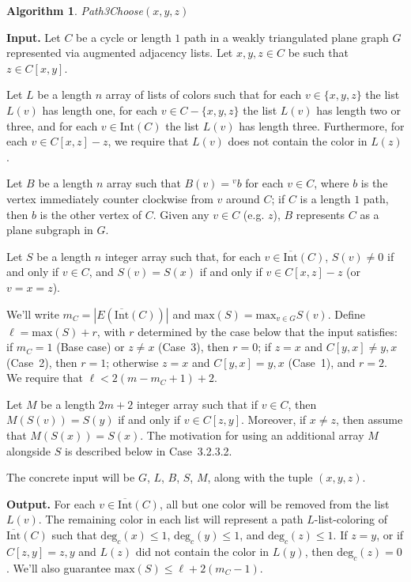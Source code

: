 \documentclass[12pt,letterpaper]{article}
\newcommand{\adj}[2]{{}^{#1}{#2}}
\newcommand{\graphinto}{\text{Int}}
\newcommand{\graphintc}{\overline{\text{Int}}}
\theoremstyle{plain}
\theoremstyle{definition}
\theoremstyle{break}
\newtheorem{algorithm}[lemma]{Algorithm}     %
\begin{document}
\begin{algorithm}\label{A:hartman_impl} \emph{Path3Choose}$(x,y,z)$

\textbf{Input.} Let $C$ be a cycle or length $1$ path in a
weakly triangulated plane graph $G$ represented via augmented
adjacency lists.
Let $x,y,z\in C$ be such that $z\in C[x,y]$.

Let $L$ be a length $n$ array of lists of colors
such that for each $v\in\{x,y,z\}$ the list $L(v)$ has length one,
for each $v\in C-\{x,y,z\}$ the list $L(v)$ has length two
or three, and for each $v\in \graphinto(C)$ the list
$L(v)$ has length three. Furthermore, for each $v\in C[x,z] - z$, we require
that $L(v)$ does not contain the color in $L(z)$.

Let $B$ be a length $n$ array such that $B(v)=\adj{v}{b}$ for each $v\in C$, where
$b$ is the vertex immediately counter clockwise
from $v$ around $C$; if $C$ is a length $1$ path, then $b$
is the other vertex of $C$. Given any $v\in C$ (e.g. $z$),
$B$ represents $C$ as a plane subgraph in $G$.

Let $S$ be a length $n$ integer array such
that, for each $v\in\graphintc(C)$, $S(v)\ne 0$ if and only if $v\in C$, and
$S(v)=S(x)$ if and only if $v\in C[x,z]-z$ (or $v=x=z$).

We'll write $m_C=|E(\graphintc(C))|$ and
$\text{max}(S)=\text{max}_{v\in G} S(v)$.
Define $\ell=\text{max}(S)+r$, with $r$
determined by the case below that the input satisfies:
if $m_C=1$ (Base case) or $z\ne x$ (Case~3), then $r=0$;
if $z=x$ and $C[y,x]\ne y,x$ (Case~2), then $r=1$;
otherwise $z=x$ and $C[y,x]=y,x$ (Case~1), and $r=2$.
We require that $\ell < 2(m-m_C+1) + 2$.

Let $M$
be a length $2m+2$ integer array such that if $v\in C$,
then $M(S(v))=S(y)$ if and only if $v\in C[z,y]$. Moreover,
if $x\ne z$, then assume that $M(S(x))=S(x)$. The
motivation for using an additional array $M$ alongside $S$
is described below in Case~3.2.3.2.

The concrete input will be $G$, $L$,
$B$, $S$, $M$, along with the tuple $(x,y,z)$.

\textbf{Output.} For each $v\in\graphintc(C)$, all but one color will be
removed from the list $L(v)$. The remaining color in each list will represent
a path $L$-list-coloring of $\graphintc(C)$
such that $\text{deg}_c(x)\le1$, $\text{deg}_c(y)\le1$, and
$\text{deg}_c(z)\le1$. If $z=y$, or if $C[z,y]=z,y$ and $L(z)$ did not
contain the color in $L(y)$, then $\text{deg}_c(z)=0$.
We'll also guarantee $\text{max}(S)\le\ell+2(m_C-1)$.


\end{algorithm}
\end{document}
